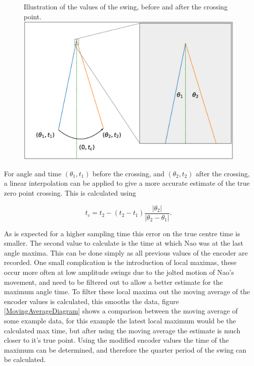 \documentclass[11pt]{article}
\begin{document}
    \begin{figure}[!htb]
        \centering
        \captionbox
             {Illustration of the values of the swing, before and after the crossing point.\label{InterpolationDiagram}}
             {\includegraphics[width=1.0\textwidth]{InterpolationDiagram.eps}}
    \end{figure}

For angle and time $(\theta_1, t_1)$ before the crossing, and $(\theta_2, t_2)$ after the crossing, a linear interpolation can be applied to give a more accurate estimate of the true zero point crossing. This is calculated using

\begin{equation}
    t_c = t_2 - (t_2 - t_1) \frac{|\theta_2|}{|\theta_2 - \theta_1|}.
\end{equation}

As is expected for a higher sampling time this error on the true centre time is smaller. The second value to calculate is the time at which Nao was at the last angle maxima. This can be done simply as all previous values of the encoder are recorded. One small complication is the introduction of local maximas, these occur more often at low amplitude swings due to the jolted motion of Nao's movement, and need to be filtered out to allow a better estimate for the maximum angle time. To filter these local maxima out the moving average of the encoder values is calculated, this smooths the data, figure \ref{MovingAverageDiagram} shows a comparison between the moving average of some example data, for this example the latest local maximum would be the calculated max time, but after using the moving average the estimate is much closer to it's true point. Using the modified encoder values the time of the maximum can be determined, and therefore the quarter period of the swing can be calculated. \\
\end{document}
